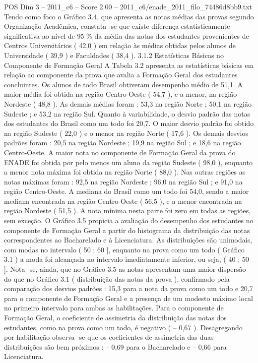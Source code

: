 \begin{textsample}{POS Dim 3 – 2011\_c6 – Score 2.00 – 2011\_c6/enade\_2011\_filo\_74486d8bb9.txt}
Tendo como foco o Gráfico 3.4, que apresenta as notas médias das provas segundo Organização Acadêmica, constata -se que existe diferença estatisticamente significativa ao nível de 95 \% da média das notas dos estudantes provenientes de Centros Universitários ( 42,0 ) em relação às médias obtidas pelos alunos de Universidade ( 39,9 ) e Faculdades ( 38,4 ). 3.1.2 Estatísticas Básicas no Componente de Formação Geral A Tabela 3.2 apresenta as estatísticas básicas em relação ao componente da prova que avalia a Formação Geral dos estudantes concluintes.
Os alunos de todo Brasil obtiveram desempenho médio de 51,1.
A maior média foi obtida na região Centro-Oeste ( 54,7 ), e a menor, na região Nordeste ( 48,8 ).
As demais médias foram : 53,3 na região Norte ; 50,1 na região Sudeste ; e 53,2 na região Sul.
Quanto à variabilidade, o desvio padrão das notas dos estudantes do Brasil como um todo foi 20,7.
O maior desvio padrão foi obtido na região Sudeste ( 22,0 ) e o menor na região Norte ( 17,6 ).
Os demais desvios padrões foram : 20,5 na região Nordeste ; 19,9 na região Sul ; e 18,6 na região Centro-Oeste.
A maior nota no componente de Formação Geral da prova do ENADE foi obtida por pelo menos um aluno da região Sudeste ( 98,0 ), enquanto a menor nota máxima foi obtida na região Norte ( 88,0 ).
Nas outras regiões as notas máximas foram : 92,5 na região Nordeste ; 96,0 na região Sul ; e 91,0 na região Centro-Oeste.
A mediana do Brasil como um todo foi 54,0, sendo a maior mediana encontrada na região Centro-Oeste ( 56,5 ), e a menor encontrada na região Nordeste ( 51,5 ).
A nota mínima nesta parte foi zero em todas as regiões, sem exceção.
O Gráfico 3.5 propicia a avaliação do desempenho dos estudantes no componente de Formação Geral a partir do histograma da distribuição das notas correspondentes ao Bacharelado e à Licenciatura.
As distribuições são unimodais, com modas no intervalo ( 50 ; 60 ], enquanto na prova como um todo ( Gráfico 3.1 ) a moda foi alcançada no intervalo imediatamente inferior, ou seja, ( 40 ; 50 ].
Nota -se, ainda, que no Gráfico 3.5 as notas apresentam uma maior dispersão do que no Gráfico 3.1 ( distribuição das notas da prova ), confirmado pela comparação dos desvios padrões : 15,3 para a nota da prova como um todo e 20,7 para o componente de Formação Geral e a presença de um modesto máximo local no primeiro intervalo para ambas as habilitações.
Para o componente de Formação Geral, o coeficiente de assimetria da distribuição das notas dos estudantes, como na prova como um todo, é negativo ( – 0,67 ).
Desagregando por habilitação observa -se que os coeficientes de assimetria das duas distribuições são bem próximos : – 0,69 para o Bacharelado e – 0,66 para Licenciatura.

\end{textsample}
